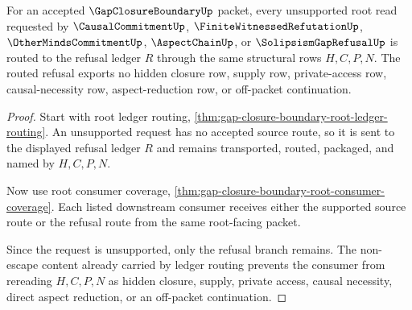 \begin{theorem}\label{thm:gap-closure-boundary-refusal-consumer-uniformity}
For an accepted $\GapClosureBoundaryUp$ packet, every unsupported root read requested by $\CausalCommitmentUp$, $\FiniteWitnessedRefutationUp$, $\OtherMindsCommitmentUp$, $\AspectChainUp$, or $\SolipsismGapRefusalUp$ is routed to the refusal ledger $R$ through the same structural rows $H,C,P,N$. The routed refusal exports no hidden closure row, supply row, private-access row, causal-necessity row, aspect-reduction row, or off-packet continuation.
\end{theorem}
\begin{proof}
Start with root ledger routing, \autoref{thm:gap-closure-boundary-root-ledger-routing}. An unsupported request has no accepted source route, so it is sent to the displayed refusal ledger $R$ and remains transported, routed, packaged, and named by $H,C,P,N$.

Now use root consumer coverage, \autoref{thm:gap-closure-boundary-root-consumer-coverage}. Each listed downstream consumer receives either the supported source route or the refusal route from the same root-facing packet.

Since the request is unsupported, only the refusal branch remains. The non-escape content already carried by ledger routing prevents the consumer from rereading $H,C,P,N$ as hidden closure, supply, private access, causal necessity, direct aspect reduction, or an off-packet continuation.
\end{proof}

